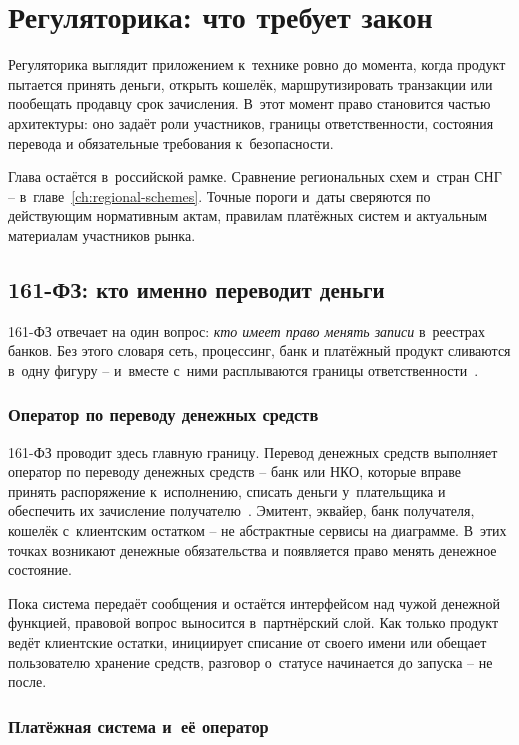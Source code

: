 
\chapter{Регуляторика: что требует закон}\label{ch:regulation}
Регуляторика выглядит приложением к~технике ровно до момента, когда продукт пытается принять деньги, открыть кошелёк, маршрутизировать транзакции или пообещать продавцу срок зачисления.
В~этот момент право становится частью архитектуры: оно задаёт роли участников, границы ответственности, состояния перевода и обязательные требования к~безопасности.

Глава остаётся в~российской рамке. Сравнение региональных схем и~стран СНГ -- в~главе~\ref{ch:regional-schemes}. Точные пороги и~даты сверяются по действующим нормативным актам, правилам платёжных систем и актуальным материалам участников рынка.

\section{161-ФЗ: кто именно переводит деньги}\label{sec:regulation-161fz}

161-ФЗ отвечает на один вопрос: \emph{кто имеет право менять записи} в~реестрах банков.
Без этого словаря сеть, процессинг, банк и платёжный продукт сливаются в~одну фигуру -- и~вместе с~ними расплываются границы ответственности~\cite{fz-161}.

\subsection*{Оператор по переводу денежных средств}

161-ФЗ проводит здесь главную границу. Перевод денежных средств выполняет оператор по переводу денежных средств -- банк или НКО, которые вправе принять распоряжение к~исполнению, списать деньги у~плательщика и обеспечить их зачисление получателю~\cite{fz-161}.
Эмитент, эквайер, банк получателя, кошелёк с~клиентским остатком -- не абстрактные сервисы на диаграмме. В~этих точках возникают денежные обязательства и появляется право менять денежное состояние.

Пока система передаёт сообщения и остаётся интерфейсом над чужой денежной функцией, правовой вопрос выносится в~партнёрский слой. Как только продукт ведёт клиентские остатки, инициирует списание от своего имени или обещает пользователю хранение средств, разговор о~статусе начинается до запуска -- не после.

\subsection*{Платёжная система и~её оператор}


